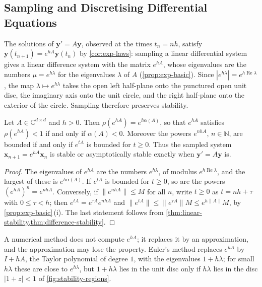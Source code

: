 \subsection{Sampling and Discretising Differential Equations}

The solutions of $\mathbf y'=A\mathbf y$, observed at the times $t_n=nh$, satisfy $\mathbf y(t_{n+1})=e^{hA}\mathbf y(t_n)$ by \cref{cor:exp-laws}: sampling a linear differential system gives a linear difference system with the matrix $e^{hA}$, whose eigenvalues are the numbers $\mu=e^{h\lambda}$ for the eigenvalues $\lambda$ of $A$ (\cref{prop:exp-basic}). Since $|e^{h\lambda}|=e^{h\operatorname{Re}\lambda}$, the map $\lambda\mapsto e^{h\lambda}$ takes the open left half-plane onto the punctured open unit disc, the imaginary axis onto the unit circle, and the right half-plane onto the exterior of the circle. Sampling therefore preserves stability.

\begin{proposition}
\label{prop:sampling-stability}
Let $A\in\mathbb C^{d\times d}$ and $h>0$. Then $\rho(e^{hA})=e^{h\alpha(A)}$, so that $e^{hA}$ satisfies $\rho(e^{hA})<1$ if and only if $\alpha(A)<0$. Moreover the powers $e^{nhA}$, $n\in\mathbb N$, are bounded if and only if $e^{tA}$ is bounded for $t\ge0$. Thus the sampled system $\mathbf x_{n+1}=e^{hA}\mathbf x_n$ is stable or asymptotically stable exactly when $\mathbf y'=A\mathbf y$ is.
\end{proposition}

\begin{proof}
The eigenvalues of $e^{hA}$ are the numbers $e^{h\lambda}$, of modulus $e^{h\operatorname{Re}\lambda}$, and the largest of these is $e^{h\alpha(A)}$. If $e^{tA}$ is bounded for $t\ge0$, so are the powers $(e^{hA})^n=e^{nhA}$. Conversely, if $\|e^{nhA}\|\le M$ for all $n$, write $t\ge0$ as $t=nh+\tau$ with $0\le\tau<h$; then $e^{tA}=e^{\tau A}e^{nhA}$ and $\|e^{tA}\|\le\|e^{\tau A}\|M\le e^{h\|A\|}M$, by \cref{prop:exp-basic}\,(i). The last statement follows from \cref{thm:linear-stability,thm:difference-stability}.
\end{proof}

A numerical method does not compute $e^{hA}$; it replaces it by an approximation, and the approximation may lose the property. Euler's method replaces $e^{hA}$ by $I+hA$, the Taylor polynomial of degree $1$, with the eigenvalues $1+h\lambda$; for small $h\lambda$ these are close to $e^{h\lambda}$, but $1+h\lambda$ lies in the unit disc only if $h\lambda$ lies in the disc $|1+z|<1$ of \cref{fig:stability-regions}.

